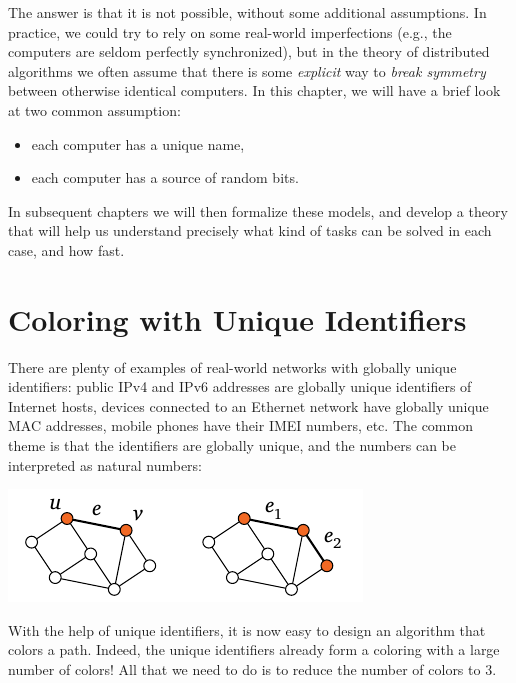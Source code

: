The answer is that it is not possible, without some additional assumptions. In practice, we could try to rely on some real-world imperfections (e.g., the computers are seldom perfectly synchronized), but in the theory of distributed algorithms we often assume that there is some \emph{explicit} way to \emph{break symmetry} between otherwise identical computers. In this chapter, we will have a brief look at two common assumption:
\begin{itemize}[noitemsep]
    \item each computer has a unique name,
    \item each computer has a source of random bits.
\end{itemize}
In subsequent chapters we will then formalize these models, and develop a theory that will help us understand precisely what kind of tasks can be solved in each case, and how fast.


\section{Coloring with Unique Identifiers}\label{sec:algo-p3c}

There are plenty of examples of real-world networks with globally unique identifiers: public IPv4 and IPv6 addresses are globally unique identifiers of Internet hosts, devices connected to an Ethernet network have globally unique MAC addresses, mobile phones have their IMEI numbers, etc. The common theme is that the identifiers are globally unique, and the numbers can be interpreted as natural numbers:
\begin{center}
    \includegraphics[page=\PIntroId]{figs.pdf}
\end{center}
With the help of unique identifiers, it is now easy to design an algorithm that colors a path. Indeed, the unique identifiers already form a coloring with a large number of colors! All that we need to do is to reduce the number of colors to $3$.


